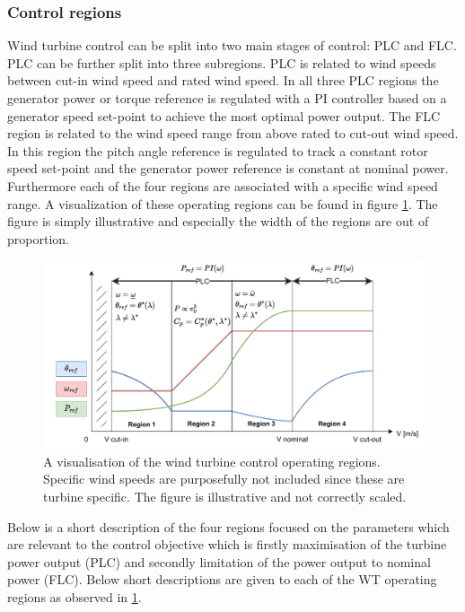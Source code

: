 \subsubsection{Control regions} \label{sec:theory_ctrl_regions}
Wind turbine control can be split into two main stages of control: PLC and FLC. PLC can be further split into three subregions. PLC is related to wind speeds between cut-in wind speed and rated wind speed. In all three PLC regions the generator power or torque reference is regulated with a PI controller based on a generator speed set-point to achieve the most optimal power output. The FLC region is related to the wind speed range from above rated to cut-out wind speed. In this region the pitch angle reference is regulated to track a constant rotor speed set-point and the generator power reference is constant at nominal power. Furthermore each of the four regions are associated with a specific wind speed range. A visualization of these operating regions can be found in figure \cref{fig:operating_regions}. The figure is simply illustrative and especially the width of the regions are out of proportion. 
\begin{figure}[ht]
	\centering
	\includegraphics[width=0.9\linewidth]{Graphics/OperatingRegions.pdf}
	\caption{A visualisation of the wind turbine control operating regions. Specific wind speeds are purposefully not included since these are turbine specific. The figure is illustrative and not correctly scaled.}
	\label{fig:operating_regions}
\end{figure}
Below is a short description of the four regions focused on the parameters which are relevant to the control objective which is firstly maximisation of the turbine power output (PLC) and secondly limitation of the power output to nominal power (FLC). Below short descriptions are given to each of the WT operating regions as observed in \cref{fig:operating_regions}.
